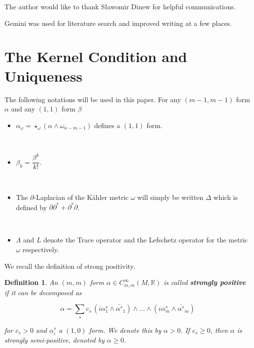 \documentclass[11pt,letterpaper]{amsart}
\newcommand{\spartial}{\partial^*}
\newtheorem{definition}[theorem]{Definition}
\numberwithin{equation}{section}
\begin{document}
The author would like to thank Sławomir Dinew for helpful communications. 

Gemini was used for literature search and improved writing at a few places.



\section{The Kernel Condition and Uniqueness}

\bigskip


The following notations will be used in this paper. For any $(m-1,m-1)$ form $\alpha$ and any $(1,1)$ form $\beta$

\begin{itemize}

    \item $\alpha_{\omega} = \star_{\omega}(\alpha \wedge \omega_{n-m-1})$ defines a $(1,1)$ form.

    \

    \item $\beta_{k}=\dfrac{\beta^k}{k!}.$

    \

    \item The $\partial$-Laplacian of the K\"ahler metric $\omega$ will simply be written $\Delta$ which is defined by $\partial \spartial + \spartial \partial$.

    \

    \item $\Lambda$ and $L$ denote the Trace operator and the Lefschetz operator for the metric $\omega$ respectively.
\end{itemize}



We recall the definition of strong positivity.

\begin{definition}
    An $(m,m)$ form $\alpha \in C^{\infty}_{m,m}(M,\mathbb R)$ is called {\bf strongly positive} if it can be decomposed as 

     $$\alpha =  \sum_{s} c_s \, (i\alpha^s_1 \wedge \bar{\alpha^s}_1) \wedge \dots \wedge (i\alpha^s_m \wedge \bar{\alpha^s}_m)$$

     \noindent for $c_s >0$ and $\alpha^s_i$ a $(1,0)$ form. We denote this by $\alpha >0$. If $c_s \geq 0$, then $\alpha$ is strongly semi-positive, denoted by $\alpha \geq 0$. 
\end{definition}
\end{document}
